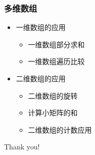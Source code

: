 \begin{frame}[fragile]
    \frametitle{多维数组}

    \begin{itemize}[<+->]
        \item 一维数组的应用
        
            \begin{itemize}
                \item 一维数组部分求和
                \item 一维数组遍历比较
            \end{itemize}

        \item 二维数组的应用
        
            \begin{itemize}
                \item 二维数组的旋转
                \item 计算小矩阵的和
                \item 二维数组的计数应用
            \end{itemize}

    \end{itemize}
\end{frame}

\begin{frame}
    \begin{center}
        {\Huge Thank you!}
    \end{center}
\end{frame}



